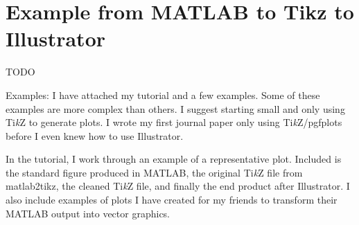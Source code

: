 \documentclass[journal,10pt]{IEEEtran}
\newcommand{\tikz}{\textup{Ti\textit{k}Z}\xspace}
\begin{document}
\section{Example from MATLAB to Tikz to Illustrator}

TODO

Examples:
I have attached my tutorial and a few examples.
Some of these examples are more complex than others.
I suggest starting small and only using \tikz to generate plots.
I wrote my first journal paper only using \tikz/pgfplots before I even knew how to use Illustrator.

In the tutorial, I work through an example of a representative plot.
Included is the standard figure produced in MATLAB, the original \tikz file from matlab2tikz, the cleaned \tikz file, and finally the end product after Illustrator.
I also include examples of plots I have created for my friends to transform their MATLAB output into vector graphics.
\end{document}
